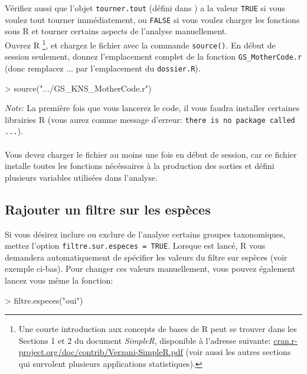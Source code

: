 \documentclass{article}
\begin{document}
  Vérifiez aussi que l'objet \texttt{tourner.tout} (défini dans \mcode) a la valeur \texttt{TRUE} si vous voulez
tout tourner immédiatement, ou \texttt{FALSE} si vous voulez
charger les fonctions sous R et tourner certains
aspects de l'analyse manuellement.
\\
Ouvrez R \footnote{Une courte introduction aux concepts de bases de R peut
  se trouver dans les Sections 1 et 2 du document \emph{SimpleR}, disponible
  à l'adresse suivante:
  \url{cran.r-project.org/doc/contrib/Verzani-SimpleR.pdf} (voir aussi
  les autres sections qui survolent plusieurs applications
  statistiques).}, et chargez le fichier \mcode {} avec la commande
\texttt{source()}.
  En début de session seulement, donnez
  l'emplacement complet de la fonction \texttt{GS\_MotherCode.r} (donc
  remplacez ... par l'emplacement du \texttt{dossier.R}).


\begin{Schunk}
\begin{Sinput}
> source(".../GS_KNS_MotherCode.r")
\end{Sinput}
\end{Schunk}

\emph{Note}: La première fois que vous lancerez le code, il vous
faudra installer certaines librairies R (vous aurez comme message d'erreur:
\texttt{there is no package called ...}). \\
\\

 Vous devez charger le fichier \mcode {} au moins
une fois en début de session, car ce fichier installe toutes les fonctions nécéssaires à la production des
sorties et défini plusieurs
variables utilisées dans l'analyse.

\subsection*{Rajouter un filtre sur les espèces}
Si vous désirez inclure ou exclure de l'analyse certains groupes
taxonomiques, mettez l'option \texttt{filtre.sur.especes =
  TRUE}. Lorsque \mcode {} est lancé, R vous
demandera automatiquement de spécifier les valeurs du filtre sur
espèces (voir exemple ci-bas). Pour changer ces valeurs manuellement,
vous pouvez également lancez
vous même la fonction:

\begin{Schunk}
\begin{Sinput}
> filtre.especes("oui")
\end{Sinput}
\end{Schunk}
\end{document}
